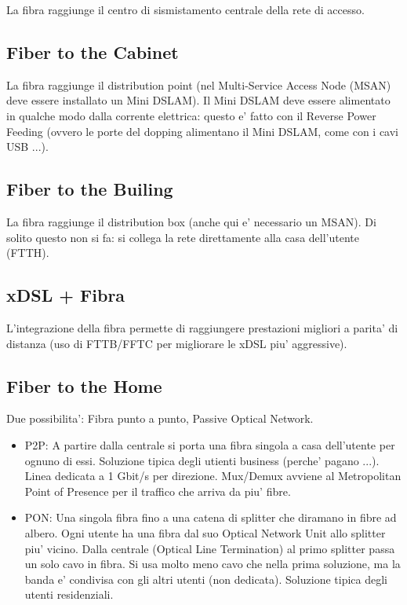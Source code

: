 La fibra raggiunge il centro di sismistamento centrale della rete di accesso.


\subsection{Fiber to the Cabinet}

La fibra raggiunge il distribution point (nel Multi-Service Access Node (MSAN) deve essere installato un Mini DSLAM).
Il Mini DSLAM deve essere alimentato in qualche modo dalla corrente elettrica: questo e' fatto con il Reverse Power Feeding (ovvero le porte del dopping alimentano il Mini DSLAM, come con i cavi USB ...).


\subsection{Fiber to the Builing}

La fibra raggiunge il distribution box (anche qui e' necessario un MSAN).
Di solito questo non si fa: si collega la rete direttamente alla casa dell'utente (FTTH).


\subsection{xDSL + Fibra}

L'integrazione della fibra permette di raggiungere prestazioni migliori a parita' di distanza (uso di FTTB/FFTC per migliorare le xDSL piu' aggressive).


\subsection{Fiber to the Home}

Due possibilita': Fibra punto a punto, Passive Optical Network.

\begin{itemize}
  \item P2P: A partire dalla centrale si porta una fibra singola a casa dell'utente per ognuno di essi. Soluzione tipica degli utienti business (perche' pagano ...). Linea dedicata a 1 Gbit/s per direzione. Mux/Demux avviene al Metropolitan Point of Presence per il traffico che arriva da piu' fibre.
  \item PON: Una singola fibra fino a una catena di splitter che diramano in fibre ad albero. Ogni utente ha una fibra dal suo Optical Network Unit allo splitter piu' vicino. Dalla centrale (Optical Line Termination) al primo splitter passa un solo cavo in fibra. Si usa molto meno cavo che nella prima soluzione, ma la banda e' condivisa con gli altri utenti (non dedicata). Soluzione tipica degli utenti residenziali.
\end{itemize}

